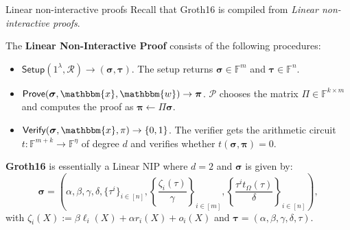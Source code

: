 \documentclass{zkdl-presentation-template}
\begin{document}
    \begin{frame}{Linear non-interactive proofs}
        Recall that Groth16 is compiled from \textit{Linear non-interactive proofs}.\pause
        \begin{definition}
            The \textbf{Linear Non-Interactive Proof} consists of the following procedures:
            \begin{itemize}
                \item $\textsf{Setup}(1^{\lambda}, \mathcal{R}) \to (\boldsymbol{\sigma},\boldsymbol{\tau})$. The setup 
                returns $\boldsymbol{\sigma} \in \mathbb{F}^m$ and $\boldsymbol{\tau} \in \mathbb{F}^n$. \pause
                \item $\textsf{Prove}(\boldsymbol{\sigma}, \mathbbm{x},
                \mathbbm{w}) \to \boldsymbol{\pi}$. $\mathcal{P}$ chooses the
                matrix $\Pi \in \mathbb{F}^{k \times m}$ and computes the proof
                as $\boldsymbol{\pi} \gets \Pi \boldsymbol{\sigma}$.\pause
                \item $\textsf{Verify}(\boldsymbol{\sigma}, \mathbbm{x}, \pi)\to\{0,1\}$.
                The verifier gets the arithmetic circuit $t: \mathbb{F}^{m+k}
                \to \mathbb{F}^{\eta}$ of degree $d$ and verifies whether
                $t(\boldsymbol{\sigma},\boldsymbol{\pi}) = 0$.\pause
            \end{itemize}
        \end{definition}
        \vspace{-10px}

        \textbf{Groth16} is essentially a Linear NIP where $d=2$ and
        $\boldsymbol{\sigma}$ is given by:
        \begin{equation*}
            \boldsymbol{\sigma} = \left(\alpha,\beta,\gamma,\delta,\{\tau^i\}_{i \in [n]}, \left\{\frac{\zeta_i(\tau)}{\gamma}\right\}_{i \in [m]}, \left\{\frac{\tau^it_{\Omega}(\tau)}{\delta}\right\}_{i \in [n]}\right),
        \end{equation*}
        with $\zeta_i(X) := \beta \ell_i(X) + \alpha r_i(X) + o_i(X)$ and
        $\boldsymbol{\tau} = (\alpha,\beta,\gamma,\delta,\tau)$.
    \end{frame}
\end{document}
